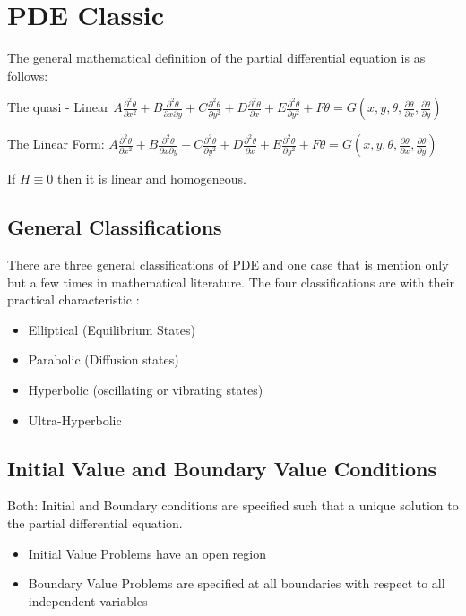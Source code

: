 \documentclass[11pt]{article}
\begin{document}
\section {PDE Classic} 
The general mathematical definition of the partial differential equation is as follows:

The quasi - Linear
$A \frac{\partial ^2 \theta }{\partial x^2} + B \frac{\partial ^2 \theta }{\partial x \partial y} +  C \frac{\partial ^2 \theta }{\partial y^2} + D \frac{\partial ^2 \theta }{\partial x} + E \frac{\partial ^2 \theta }{\partial y^2} + F\theta = G(x,y, \theta , \frac{\partial \theta}{\partial x} ,  \frac{\partial \theta}{\partial y} )$

The Linear Form:
$A \frac{\partial ^2 \theta }{\partial x^2} + B \frac{\partial ^2 \theta }{\partial x \partial y} +  C \frac{\partial ^2 \theta }{\partial y^2} + D \frac{\partial ^2 \theta }{\partial x} + E \frac{\partial ^2 \theta }{\partial y^2} + F\theta = G(x,y, \theta , \frac{\partial \theta}{\partial x} ,  \frac{\partial \theta}{\partial y} )$

If $H\equiv 0 $ then it is linear and homogeneous.  

\subsection {General Classifications} 
There are three general classifications of PDE and one case that is mention only but a few times in mathematical literature.  The four classifications are with their practical characteristic :
\begin{itemize}
\item Elliptical (Equilibrium States)
\item Parabolic (Diffusion states) 
\item Hyperbolic (oscillating or vibrating states)
\item Ultra-Hyperbolic 
\end{itemize}

\subsection {Initial Value and Boundary Value Conditions}

Both: Initial and Boundary conditions are specified such that a unique solution to the partial differential equation.  

\begin{itemize}
\item Initial Value Problems have an open region 
\item Boundary Value Problems are specified at all boundaries with respect to all independent variables
\end{itemize}
\end{document}
